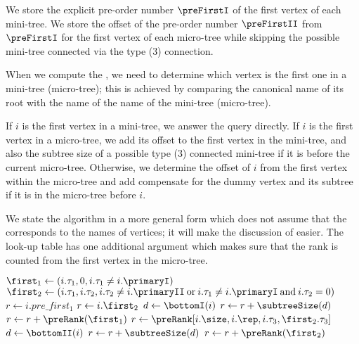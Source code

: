We store the explicit pre-order number $\preFirstI$ of the first vertex of each mini-tree.
We store the offset of the pre-order number $\preFirstII$ from $\preFirstI$ for the first vertex of each micro-tree while skipping the possible mini-tree connected via the type (3) connection.

When we compute the \preRank{}, we need to determine which vertex is the first one in a mini-tree (micro-tree); this is achieved by comparing the canonical name of  its root with the name of the name of the mini-tree (micro-tree).

If $i$ is the first vertex in a mini-tree, we answer the query directly.
If $i$ is the first vertex in a micro-tree, we add its offset to the first vertex in the mini-tree, and also the subtree size of a possible type (3) connected mini-tree if it is before the current micro-tree.
Otherwise, we determine the offset of $i$ from the first vertex within the micro-tree and add compensate for the dummy vertex and its subtree if it is in the micro-tree before $i$.

We state the algorithm in a more general form which does not assume that the \preRank{} corresponds to the names of vertices; it will make the discussion of \postRank{} easier.
The look-up table \preRank{} has one additional argument which makes sure that the rank is counted from the first vertex in the micro-tree.

\begin{algorithm}
\begin{algorithmic}
	\State $\first_1 \gets (i.\tau_1, 0, i.\tau_1 \ne i.\primaryI)$
	\State $\first_2 \gets (i.\tau_1, i.\tau_2, i.\tau_2 \ne i.\primaryII \boolor i.\tau_1 \ne i.\primaryI \booland i.\tau_2 = 0)$
	 
		\State $r \gets i.pre\_first_1$
	 
		\State $r \gets i.\first_2$
			\State $d \gets \bottomI(i)$
			\State $r \gets r + \subtreeSize(d)$ 
		\EndIf
		\State $r \gets r + \preRank(\first_1)$
	\Else {}
		\State $r \gets \preRank[i.\size, i.\rep, i.\tau_3, \first_2.\tau_3]$
			\State $d \gets \bottomII(i)$
			\State $r \gets r + \subtreeSize(d)$ 
		\EndIf
		\State $r \gets r + \preRank(\first_2)$
	\EndIf
	
	\State {}
\EndFunction
\end{algorithmic}
\end{algorithm}

